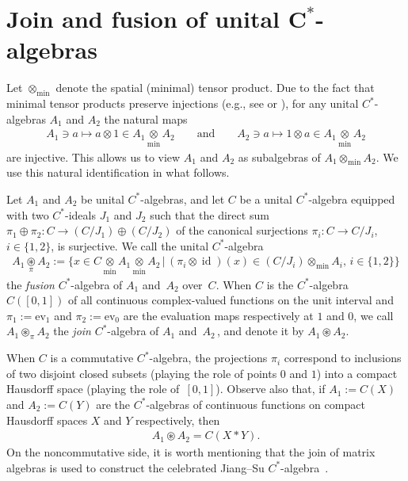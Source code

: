 \documentclass[pdftex]{sigma}
\numberwithin{equation}{section}
\begin{document}
\section[Join and fusion of unital $C^*$-algebras]{Join and fusion of unital $\boldsymbol{C^*}$-algebras}


Let $\otimes_{\min}$ denote the spatial (minimal) tensor product.
Due to the fact that minimal tensor products preserve injections
 (e.g., see \cite[Proposition~4.22]{t-m79} or
\cite[Section~1.3]{w-s94}),
for any unital $C^*$-algebras $A_1$ and $A_2$ the natural maps
\begin{gather*}
A_1\ni a\longmapsto a\otimes 1\in A_1 \underset{\min}{\otimes} A_2\qquad \text{and}
\qquad  A_2\ni a\longmapsto 1\otimes a\in A_1 \underset{\min}{\otimes} A_2
\end{gather*}
are injective. This allows us to view $A_1$ and $A_2$ as subalgebras of
$A_1 \otimes_{\min} A_2$. We use this natural identif\/ication in what follows.
\begin{Definition}\label{gjoin}
Let $A_1$ and $A_2$  be unital $C^*$-algebras, and
let $C$ be a unital $C^*$-algebra equipped with two $C^*$-ideals $J_1$ and $ J_2$
such that the direct sum
$
\pi_1\oplus\pi_2\colon C\rightarrow (C/J_1) \oplus (C/J_2)
$
of the canonical surjections $\pi_i\colon C\to C/J_i$, $i\in \{1,2\}$, is surjective.
We call the unital $C^*$-algebra
\begin{gather*}
A_1 \underset{\pi}{\circledast} A_2 :=
\big\{x\in C \underset{\min}{\otimes} A_1 \underset{\min}{\otimes} A_2 \,
\big|\,
(\pi_i\otimes \operatorname{id})(x) \in
(C/J_i)\otimes_{\min}A_i
, \, i\in\{1,2\}
\big\}
\end{gather*}
the \emph{fusion} $C^*$-algebra of $A_1$ and~$A_2$ over~$C$.
When $C$ is the $C^*$-algebra $C([0,1])$ of all continuous complex-valued
functions on the unit interval and
$\pi_1:=\mathrm{ev}_1$ and $\pi_2:=\mathrm{ev}_0$ are
the evaluation maps respectively at $1$ and $0$,
we call $A_1 \circledast_\pi A_2$ the \emph{join} $C^*$-algebra of $A_1$ and~$A_2\,$, and denote it by
 $A_1 \circledast A_2$.
\end{Definition}

When $C$ is
a commutative $C^*$-algebra, the projections $\pi_i$  correspond to inclusions  of
two disjoint closed subsets (playing the role of points $0$ and $1$) into a compact Hausdorf\/f
space (playing the role of~$[0,1]$).
Observe also that,
if $A_1:=C(X)$ and $A_2 := C(Y)$ are the \mbox{$C^*$-algebras}
 of continuous functions on compact Hausdorf\/f spaces
$X$ and $Y$ respectively,
then
\begin{gather*}
A_1 \circledast A_2 = C(X * Y).
\end{gather*}
On the noncommutative side,
it is worth mentioning  that the join of matrix algebras is used to construct the celebrated
Jiang--Su $C^*$-algebra~\cite{js99}.
\end{document}

